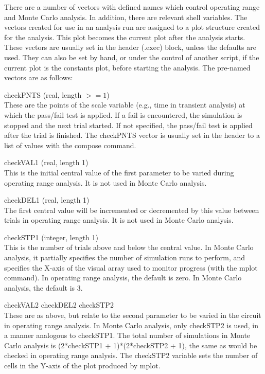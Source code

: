 There are a number of vectors with defined names which control
operating range and Monte Carlo analysis.  In addition, there are
relevant shell variables.  The vectors created for use in an analysis
run are assigned to a plot structure created for the analysis.  This
plot becomes the current plot after the analysis starts.  These
vectors are usually set in the header ({\vt .exec}) block, unless the
defaults are used.  They can also be set by hand, or under the control
of another script, if the current plot is the {\vt constants} plot,
before starting the analysis.  The pre-named vectors are as follows:

\begin{description}
\item{\et checkPNTS} (real, length $>= 1$)\\
These are the points of the scale variable (e.g., {\et time} in
transient analysis) at which the pass/fail test is applied.  If a fail
is encountered, the simulation is stopped and the next trial started. 
If not specified, the pass/fail test is applied after the trial is
finished.  The {\et checkPNTS} vector is usually set in the header
to a list of values with the {\cb compose} command.

\item{\et checkVAL1} (real, length 1)\\
This is the initial central value of the first parameter to be varied
during operating range analysis.  It is not used in Monte Carlo
analysis.

\item{\et checkDEL1} (real, length 1)\\
The first central value will be incremented or decremented by this
value between trials in operating range analysis.  It is not used in
Monte Carlo analysis.

\item{\et checkSTP1} (integer, length 1)\\
This is the number of trials above and below the central value.  In
Monte Carlo analysis, it partially specifies the number of simulation
runs to perform, and specifies the X-axis of the visual array used
to monitor progress (with the {\cb mplot} command).  In operating
range analysis, the default is zero.  In Monte Carlo analysis, the
default is 3.

\item{\et checkVAL2 checkDEL2 checkSTP2}\\
These are as above, but relate to the second parameter to be varied in
the circuit in operating range analysis.  In Monte Carlo analysis,
only {\et checkSTP2} is used, in a manner analogous to {\et
checkSTP1}.  The total number of simulations in Monte Carlo analysis
is {\vt (2*checkSTP1 + 1)*(2*checkSTP2 + 1)}, the same as would be
checked in operating range analysis.  The {\et checkSTP2} variable sets
the number of cells in the Y-axis of the plot produced by {\cb mplot}.


\end{description}
